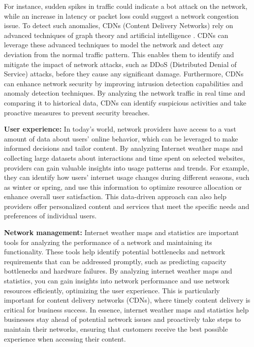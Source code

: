 \documentclass[sigconf,authorversion,nonacm]{acmart}
\begin{document}
For instance, sudden spikes in traffic could indicate a bot attack on the network, while an increase in latency or packet loss could suggest a network congestion issue. To detect such anomalies, CDNs (Content Delivery Networks) rely on advanced techniques of graph theory and artificial intelligence \cite{6932930}.  CDNs can leverage these advanced techniques to model the network and detect any deviation from the normal traffic pattern. This enables them to identify and mitigate the impact of network attacks, such as DDoS (Distributed Denial of Service) attacks, before they cause any significant damage. Furthermore, CDNs can enhance network security by improving intrusion detection capabilities and anomaly detection techniques. By analyzing the network traffic in real time and comparing it to historical data, CDNs can identify suspicious activities and take proactive measures to prevent security breaches. 

\textbf{User experience:} In today's world, network providers have access to a vast amount of data about users' online behavior, which can be leveraged to make informed decisions and tailor content. By analyzing Internet weather maps and collecting large datasets about interactions and time spent on selected websites, providers can gain valuable insights into usage patterns and trends. For example, they can identify how users' internet usage changes during different seasons, such as winter or spring, and use this information to optimize resource allocation or enhance overall user satisfaction. This data-driven approach can also help providers offer personalized content and services that meet the specific needs and preferences of individual users.

\textbf{Network management:} Internet weather maps and statistics are important tools for analyzing the performance of a network and maintaining its functionality. These tools help identify potential bottlenecks and network requirements that can be addressed promptly, such as predicting capacity bottlenecks and hardware failures. By analyzing internet weather maps and statistics, you can gain insights into network performance and use network resources efficiently, optimizing the user experience. This is particularly important for content delivery networks (CDNs), where timely content delivery is critical for business success. In essence, internet weather maps and statistics help businesses stay ahead of potential network issues and proactively take steps to maintain their networks, ensuring that customers receive the best possible experience when accessing their content.
\end{document}
